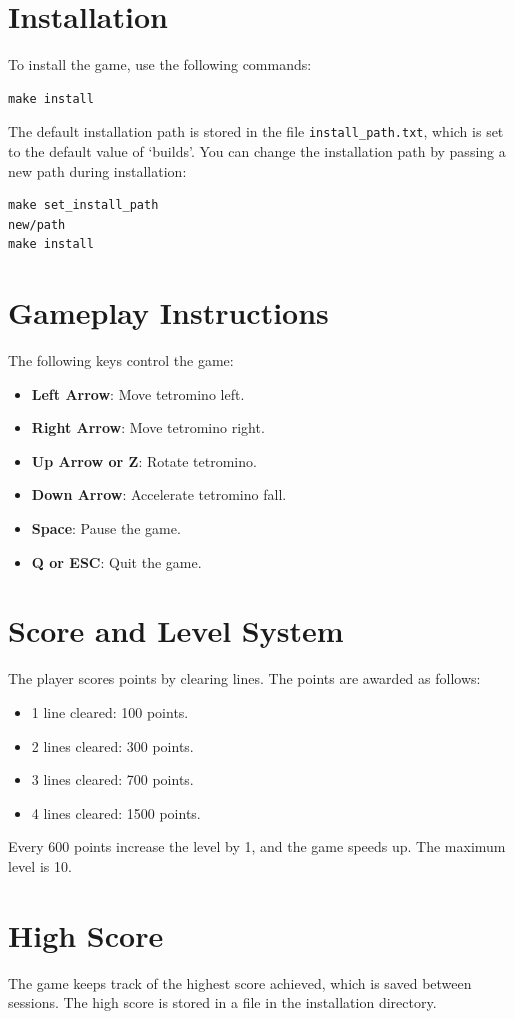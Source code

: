 \documentclass{article}
\begin{document}
\section{Installation}

To install the game, use the following commands:

\begin{verbatim}
make install
\end{verbatim}

The default installation path is stored in the file \texttt{install\_path.txt}, which is set to the default value of `builds'. You can change the installation path by passing a new path during installation:

\begin{verbatim}
make set_install_path
new/path
make install
\end{verbatim}

\section{Gameplay Instructions}
The following keys control the game:
\begin{itemize}
    \item \textbf{Left Arrow}: Move tetromino left.
    \item \textbf{Right Arrow}: Move tetromino right.
    \item \textbf{Up Arrow or Z}: Rotate tetromino.
    \item \textbf{Down Arrow}: Accelerate tetromino fall.
    \item \textbf{Space}: Pause the game.
    \item \textbf{Q or ESC}: Quit the game.
\end{itemize}

\section{Score and Level System}
The player scores points by clearing lines. The points are awarded as follows:
\begin{itemize}
    \item 1 line cleared: 100 points.
    \item 2 lines cleared: 300 points.
    \item 3 lines cleared: 700 points.
    \item 4 lines cleared: 1500 points.
\end{itemize}

Every 600 points increase the level by 1, and the game speeds up. The maximum level is 10.

\section{High Score}
The game keeps track of the highest score achieved, which is saved between sessions. The high score is stored in a file in the installation directory.
\end{document}
